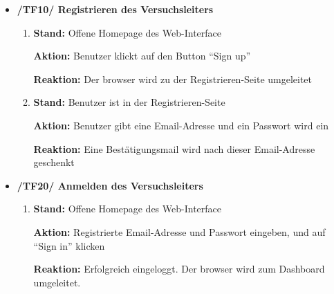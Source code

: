 \documentclass[a4paper]{scrreprt}
\begin{document}
            \begin{itemize}
                \item \textbf{/TF10/ Registrieren des Versuchsleiters}
                    \begin{enumerate}
                        \item \par \textbf{Stand: }Offene Homepage des Web-Interface
                            \par \textbf{Aktion: }Benutzer klickt auf den Button ``Sign up''
                            \par \textbf{Reaktion: }Der browser wird zu der Registrieren-Seite umgeleitet
                        \item \par \textbf{Stand: }Benutzer ist in der Registrieren-Seite
                             \par \textbf{Aktion: }Benutzer gibt eine Email-Adresse und ein Passwort wird ein
                             \par \textbf{Reaktion: }Eine Bestätigungsmail wird nach dieser Email-Adresse geschenkt
                   \end{enumerate}

                    \item \textbf{/TF20/ Anmelden des Versuchsleiters}
                        \begin{enumerate}
                            \item \par \textbf{Stand: }Offene Homepage des Web-Interface
                                \par \textbf{Aktion: }Registrierte Email-Adresse und Passwort eingeben, und auf “Sign in” klicken
                                \par \textbf{Reaktion: }Erfolgreich eingeloggt. Der browser wird zum Dashboard umgeleitet.
                        \end{enumerate}


\end{itemize}
\end{document}
